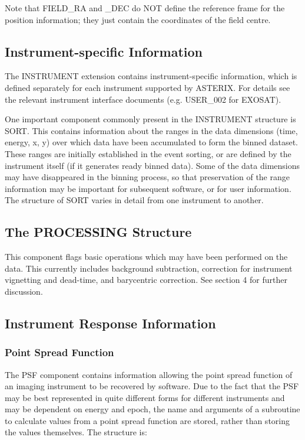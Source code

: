 Note that FIELD\_RA and \_DEC do NOT define the reference frame for  the
position  information;  they just contain the coordinates of the field
centre.

\subsection{Instrument-specific Information}

The INSTRUMENT  extension  contains  instrument-specific  information,
which  is defined separately for each instrument supported by ASTERIX.
For details see the  relevant  instrument  interface  documents  (e.g.
USER\_002 for EXOSAT).

One important component commonly present in the  INSTRUMENT  structure
is  SORT.   This  contains  information  about  the ranges in the data
dimensions (time, energy, x, y) over which data have been  accumulated
to form the binned dataset.  These ranges are initially established in
the event sorting, or are defined by  the  instrument  itself  (if  it
generates  ready  binned  data).  Some of the data dimensions may have
disappeared in the binning process, so that preservation of the  range
information  may  be  important  for  subsequent software, or for user
information.   The  structure  of  SORT  varies  in  detail  from  one
instrument to another.

\subsection{The PROCESSING Structure}

This component flags basic operations which may have been performed on
the  data.  This currently includes background subtraction, correction
for instrument vignetting and dead-time, and  barycentric  correction.
See section 4 for further discussion.

\subsection{Instrument Response Information}

\subsubsection{Point Spread Function}

The PSF component contains  information
allowing  the  point  spread  function  of an imaging instrument to be
recovered by software.  Due to the fact  that  the  PSF  may  be  best
represented in quite different forms for different instruments and may
be dependent on  energy  and  epoch,  the  name  and  arguments  of  a
subroutine  to  calculate  values  from  a  point  spread function are
stored, rather than storing the values themselves.  The structure is:

